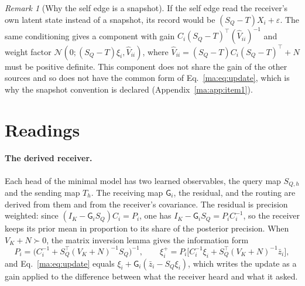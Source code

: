 \documentclass[11pt]{article}
\theoremstyle{definition}
\theoremstyle{remark}
\newtheorem{remark}[theorem]{Remark}
\newcommand{\Gauss}{\mathcal N}
\newcommand{\G}{\mathsf G}
\begin{document}
\begin{remark}[Why the self edge is a snapshot]
\label{ma:rem:snapshot}
If the self edge read the receiver's own latent state instead of a snapshot, its record would be $(S_Q-T)X_i+\varepsilon$. The same conditioning gives a component with gain $C_i(S_Q-T)^\top(\widehat V_{ii})^{-1}$ and weight factor $\Gauss(0;(S_Q-T)\xi_i,\widehat V_{ii})$, where $\widehat V_{ii}=(S_Q-T)C_i(S_Q-T)^\top+N$ must be positive definite. This component does not share the gain of the other sources and so does not have the common form of Eq.~\eqref{ma:eq:update}, which is why the snapshot convention is declared (Appendix~\ref{ma:app:item1}).
\end{remark}

\section{Readings}
\label{ma:sec:readings}

\paragraph{The derived receiver.}
Each head of the minimal model has two learned observables, the query map $S_{Q,h}$ and the sending map $T_h$. The receiving map $\G_i$, the residual, and the routing are derived from them and from the receiver's covariance. The residual is precision weighted: since $(I_K-\G_iS_Q)C_i=P_i$, one has $I_K-\G_iS_Q=P_iC_i^{-1}$, so the receiver keeps its prior mean in proportion to its share of the posterior precision. When $V_K+N\succ0$, the matrix inversion lemma \citep{petersen2012matrix} gives the information form
\begin{equation}
P_i=\bigl(C_i^{-1}+S_Q^\top(V_K+N)^{-1}S_Q\bigr)^{-1},\qquad
\xi_i^+=P_i\bigl[C_i^{-1}\xi_i+S_Q^\top(V_K+N)^{-1}\bar z_i\bigr],
\label{ma:eq:information}
\end{equation}
and Eq.~\eqref{ma:eq:update} equals $\xi_i+\G_i(\bar z_i-S_Q\xi_i)$, which writes the update as a gain applied to the difference between what the receiver heard and what it asked.
\end{document}
